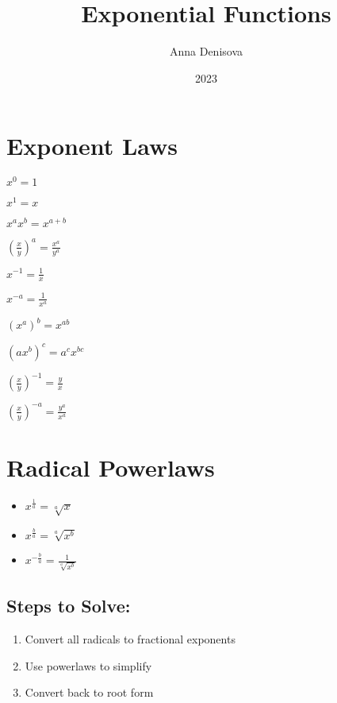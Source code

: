 \documentclass{article}
\title{Exponential Functions}
\author{Anna Denisova}
\date{2023}
\begin{document}
\maketitle



\newpage
\section{Exponent Laws}
    
\begin{itemize}
    \begin{multicols}{3}
    \item $x^0 = 1$
    \item $x^1 = x$
    \item $x^ax^b = x^{a+b}$
    \item $\left(\frac{x}{y}\right)^a = \frac{x^a}{y^a}$
    \item $x^{-1} = \frac{1}{x}$
    \item $x^{-a} = \frac{1}{x^a}$
    \item $(x^a)^b = x^{ab}$
    \item $(ax^b)^c = a^cx^{bc}$
    \item $\left(\frac{x}{y}\right)^{-1} = \frac{y}{x}$
    \item $\left(\frac{x}{y}\right)^{-a} = \frac{y^a}{x^a}$
    \end{multicols}
\end{itemize}



\section{Radical Powerlaws}

\begin{itemize}
    \item $x^{\frac{1}{a}} = \sqrt[a]{x}$
    \item $x^{\frac{b}{a}} = \sqrt[a]{x^b}$
    \item $x^{-\frac{b}{a}} = \frac{1}{\sqrt[a]{x^b}}$
\end{itemize}

\subsection*{Steps to Solve:}
\begin{enumerate}
    \item Convert all radicals to fractional exponents
    \item Use powerlaws to simplify
    \item Convert back to root form
\end{enumerate}
\end{document}
